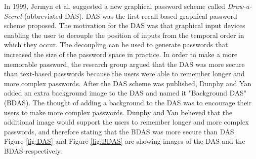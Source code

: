     \begin{figure}[H]
      \centering
    \end{figure}

  In 1999, Jermyn et al. \cite{Jermyn} suggested a new graphical password scheme called {\it Draw-a-Secret} (abbreviated DAS). DAS was the first recall-based graphical password scheme proposed. The motivation for the DAS was that graphical input devices enabling the user to decouple the position of inputs from the temporal order in which they occur. The decoupling can be used to generate passwords that increased the size of the password space in practice. In order to make a more memorable password, the research group argued that the DAS was more secure than text-based passwords because the users were able to remember longer and more complex passwords. After the DAS scheme was published, Dunphy and Yan \cite{BDAS} added an extra background image to the DAS and named it "Background DAS" (BDAS). The thought of adding a background to the DAS was to encourage their users to make more complex passwords. Dunphy and Yan believed that the additional image would support the users to remember longer and more complex passwords, and therefore stating that the BDAS was more secure than DAS. Figure \ref{fig:DAS} and Figure \ref{fig:BDAS} are showing images of the DAS and the BDAS respectively.

